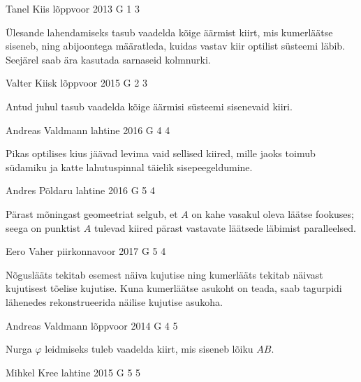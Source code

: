 \documentclass[11pt]{article}
\begin{document}
{%
{Tanel Kiis} %
{lõppvoor} %
{2013} %
{G 1} %
{3} %
{

\ifHint
Ülesande lahendamiseks tasub vaadelda kõige äärmist kiirt, mis kumerläätse siseneb, ning abijoontega määratleda, kuidas vastav kiir optilist süsteemi läbib. Seejärel saab ära kasutada sarnaseid kolmnurki.
\fi
}

{Valter Kiisk} %
{lõppvoor} %
{2015} %
{G 2} %
{3} %
{

\ifHint
Antud juhul tasub vaadelda kõige äärmisi süsteemi sisenevaid kiiri.
\fi
}

{Andreas Valdmann} %
{lahtine} %
{2016} %
{G 4} %
{4} %
{

\ifHint
Pikas optilises kius jäävad levima vaid sellised kiired, mille jaoks toimub südamiku ja katte lahutuspinnal täielik sisepeegeldumine.
\fi
}

{Andres Põldaru} %
{lahtine} %
{2016} %
{G 5} %
{4} %
{

\ifHint
Pärast mõningast geomeetriat selgub, et $A$ on kahe vasakul oleva läätse fookuses; seega on punktist $A$ tulevad kiired pärast vastavate läätsede läbimist paralleelsed.
\fi
}

{Eero Vaher} %
{piirkonnavoor} %
{2017} %
{G 5} %
{4} %
{

\ifHint
Nõguslääts tekitab esemest näiva kujutise ning kumerlääts tekitab näivast kujutisest tõelise kujutise. Kuna kumerläätse asukoht on teada, saab tagurpidi lähenedes rekonstrueerida näilise kujutise asukoha.
\fi
}

{Andreas Valdmann} %
{lõppvoor} %
{2014} %
{G 4} %
{5} %
{

\ifHint
Nurga $\varphi$ leidmiseks tuleb vaadelda kiirt, mis siseneb lõiku $AB$.
\fi
}

{Mihkel Kree} %
{lahtine} %
{2015} %
{G 5} %
{5} %
{

}}
\end{document}
